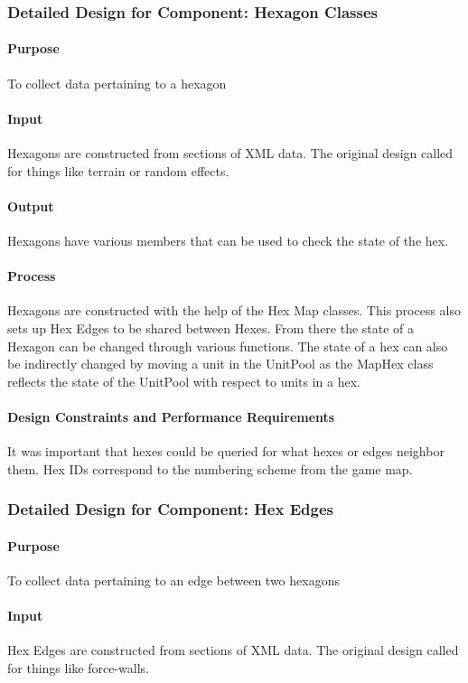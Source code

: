 \documentclass[12pt,a4paper,titlepage]{article}
\begin{document}
\subsubsection{Detailed Design for Component: Hexagon Classes}
\paragraph{Purpose} To collect data pertaining to a hexagon
\paragraph{Input}
Hexagons are constructed from sections of XML data.
The original design called for things like terrain or random effects.
\paragraph{Output}
Hexagons have various members that can be used to check the state of the hex.
\paragraph{Process}
Hexagons are constructed with the help of the Hex Map classes.
This process also sets up Hex Edges to be shared between Hexes.
From there the state of a Hexagon can be changed through various functions.
The state of a hex can also be indirectly changed by moving a unit in the UnitPool
as the MapHex class reflects the state of the UnitPool with respect to units in a hex.
\paragraph{Design Constraints and Performance Requirements}
It was important that hexes could be queried for what hexes or edges neighbor them.
Hex IDs correspond to the numbering scheme from the game map.

\subsubsection{Detailed Design for Component: Hex Edges}
\paragraph{Purpose} To collect data pertaining to an edge between two hexagons
\paragraph{Input}
Hex Edges are constructed from sections of XML data.
The original design called for things like force-walls.
\end{document}
